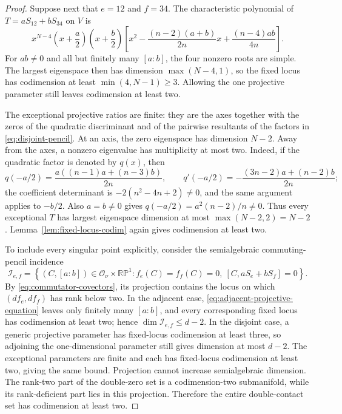 \documentclass[11pt,reqno]{amsart}
\theoremstyle{definition}
\theoremstyle{remark}
\begin{document}
\begin{proof}
Suppose next that $e=12$ and $f=34$.  The characteristic polynomial of
$T=aS_{12}+bS_{34}$ on $V$ is
\begin{equation}\label{eq:disjoint-pencil}
 x^{N-4}\left(x+\frac a2\right)\left(x+\frac b2\right)
 \left[
 x^2-\frac{(n-2)(a+b)}{2n}x+\frac{(n-4)ab}{4n}
 \right].
\end{equation}
For $ab\ne0$ and all but finitely many $[a:b]$, the four nonzero roots are
simple.  The largest eigenspace then has dimension $\max(N-4,1)$, so the
fixed locus has codimension at least $\min(4,N-1)\ge3$.  Allowing the one
projective parameter still leaves codimension at least two.

The exceptional projective ratios are finite: they are the axes together
with the zeros of the quadratic discriminant and of the pairwise resultants
of the factors in \eqref{eq:disjoint-pencil}.  At an axis, the zero
eigenspace has dimension $N-2$.  Away from the axes, a nonzero eigenvalue has
multiplicity at most two.  Indeed, if the quadratic factor is denoted by
$q(x)$, then
\[
 q(-a/2)=\frac{a((n-1)a+(n-3)b)}{2n},
 \qquad
 q'(-a/2)=-\frac{(3n-2)a+(n-2)b}{2n};
\]
the coefficient determinant is $-2(n^2-4n+2)\ne0$, and the same argument
applies to $-b/2$.  Also $a=b\ne0$ gives
$q(-a/2)=a^2(n-2)/n\ne0$.  Thus every exceptional $T$ has largest eigenspace
dimension at most $\max(N-2,2)=N-2$.  Lemma~\ref{lem:fixed-locus-codim}
again gives codimension at least two.

To include every singular point explicitly, consider the semialgebraic
commuting-pencil incidence
\[
 \mathcal I_{e,f}=
 \left\{(C,[a:b])\in\mathcal O_\nu\times\mathbb{RP}^1:
 f_e(C)=f_f(C)=0,\ [C,aS_e+bS_f]=0\right\}.
\]
By \eqref{eq:commutator-covectors}, its projection contains the locus on
which $(df_e,df_f)$ has rank below two.  In the adjacent case,
\eqref{eq:adjacent-projective-equation} leaves only finitely many
$[a:b]$, and every corresponding fixed locus has codimension at least two;
hence $\dim\mathcal I_{e,f}\le d-2$.  In the disjoint case, a generic
projective parameter has fixed-locus codimension at least three, so adjoining
the one-dimensional parameter still gives dimension at most $d-2$.
The exceptional parameters are finite and each has fixed-locus codimension
at least two, giving the same bound.  Projection cannot increase
semialgebraic dimension.  The rank-two part of the double-zero set is a
codimension-two submanifold, while its rank-deficient part lies in this
projection.  Therefore the entire double-contact set has codimension at
least two.
\end{proof}
\end{document}
